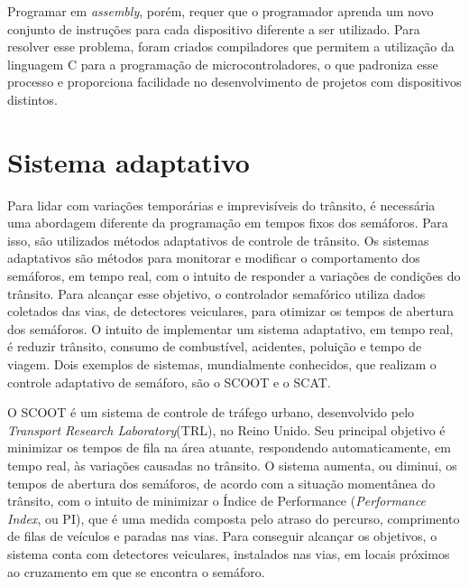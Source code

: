 Programar em \textit{assembly}, porém, requer que o programador aprenda um novo conjunto de instruções para cada dispositivo diferente a ser utilizado. Para resolver esse problema, foram criados compiladores que permitem a utilização da linguagem C para a programação de microcontroladores, o que padroniza esse processo e proporciona facilidade no desenvolvimento de projetos com dispositivos distintos.

\section{Sistema adaptativo}

Para lidar com variações temporárias e imprevisíveis do trânsito, é necessária uma abordagem diferente da programação em tempos fixos dos semáforos. Para isso, são utilizados métodos adaptativos de controle de trânsito.
Os sistemas adaptativos são métodos para monitorar e modificar o comportamento dos semáforos, em tempo real, com o intuito de responder a variações de condições do trânsito\cite{adaptive}. Para alcançar esse objetivo, o controlador semafórico utiliza dados coletados das vias, de detectores veiculares, para otimizar os tempos de abertura dos semáforos.
O intuito de implementar um sistema adaptativo, em tempo real, é reduzir trânsito, consumo de combustível, acidentes, poluição e tempo de viagem.
Dois exemplos de sistemas, mundialmente conhecidos, que realizam o controle adaptativo de semáforo, são o SCOOT e o SCAT\cite{areacontrol}.

O SCOOT é um sistema de controle de tráfego urbano, desenvolvido pelo \textit{Transport Research Laboratory}(TRL), no Reino Unido. Seu principal objetivo é minimizar os tempos de fila na área atuante, respondendo automaticamente, em tempo real, às variações causadas no trânsito. O sistema aumenta, ou diminui, os tempos de abertura dos semáforos, de acordo com a situação momentânea do trânsito, com o intuito de minimizar o Índice de Performance (\textit{Performance Index}, ou PI), que é uma medida composta pelo atraso do percurso, comprimento de filas de veículos e paradas nas vias. Para conseguir alcançar os objetivos, o sistema conta com detectores veiculares, instalados nas vias, em locais próximos ao cruzamento em que se encontra o semáforo\cite{scoot}.

